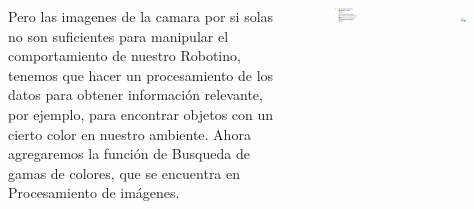 \begin{frame}
	\begin{columns}
		Pero las imagenes de la camara por si solas no son suficientes para manipular el comportamiento de nuestro Robotino, tenemos que hacer un procesamiento de los datos para obtener información relevante, por ejemplo, para encontrar objetos con un cierto color en nuestro ambiente. Ahora agregaremos la función de Busqueda de gamas de colores, que se encuentra en Procesamiento de imágenes.

		\begin{figure}
			\begin{center}
				\includegraphics[width=0.9\textwidth]{images/01-vision-artificial/05-01.png}
			\end{center}
		\end{figure}
		\begin{figure}
			\begin{center}
				\includegraphics[width=0.5\textwidth]{images/01-vision-artificial/05-02.png}
			\end{center}
		\end{figure}
	\end{columns}
\end{frame}

